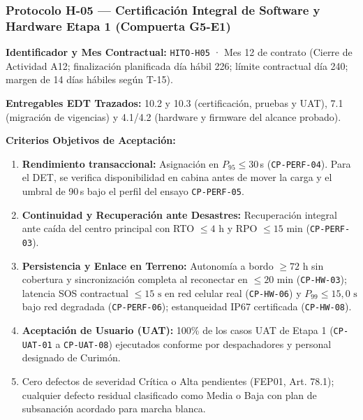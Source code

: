 \subsubsection*{Protocolo H-05 — Certificación Integral de Software y Hardware Etapa 1 (Compuerta G5-E1)}\label{sec:9-proto-h5}
\par\noindent\textbf{Identificador y Mes Contractual:} \texttt{HITO-H05} · Mes 12 de contrato (Cierre de Actividad A12; finalización planificada día hábil 226; límite contractual día 240; margen de 14 días hábiles según T-15).\par
\par\noindent\textbf{Entregables EDT Trazados:} 10.2 y 10.3 (certificación, pruebas y UAT), 7.1 (migración de vigencias) y 4.1/4.2 (hardware y firmware del alcance probado).\par
\par\noindent\textbf{Criterios Objetivos de Aceptación:}
\begin{enumerate}
  \item \textbf{Rendimiento transaccional:} Asignación en $P_{95} \le 30$\,s (\texttt{CP-PERF-04}). Para el DET, se verifica disponibilidad en cabina antes de mover la carga y el umbral de 90\,s bajo el perfil del ensayo \texttt{CP-PERF-05}.
  \item \textbf{Continuidad y Recuperación ante Desastres:} Recuperación integral ante caída del centro principal con RTO $\le 4\text{ h}$ y RPO $\le 15\text{ min}$ (\texttt{CP-PERF-03}).
  \item \textbf{Persistencia y Enlace en Terreno:} Autonomía a bordo $\ge 72\text{ h}$ sin cobertura y sincronización completa al reconectar en $\le 20\text{ min}$ (\texttt{CP-HW-03}); latencia SOS contractual $\le 15\text{ s}$ en red celular real (\texttt{CP-HW-06}) y $P_{99} \le 15{,}0\text{ s}$ bajo red degradada (\texttt{CP-PERF-06}); estanqueidad IP67 certificada (\texttt{CP-HW-08}).
  \item \textbf{Aceptación de Usuario (UAT):} 100\% de los casos UAT de Etapa 1 (\texttt{CP-UAT-01} a \texttt{CP-UAT-08}) ejecutados conforme por despachadores y personal designado de Curimón.
  \item Cero defectos de severidad Crítica o Alta pendientes (FEP01, Art. 78.1); cualquier defecto residual clasificado como Media o Baja con plan de subsanación acordado para marcha blanca.
\end{enumerate}
